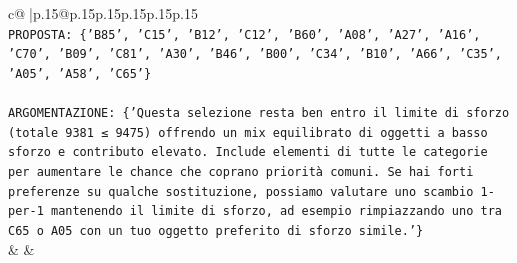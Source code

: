 \documentclass{article}
\begin{document}
{\begin{supertabular}{c@{$\;$}|p{.15\linewidth}@{}p{.15\linewidth}p{.15\linewidth}p{.15\linewidth}p{.15\linewidth}p{.15\linewidth}}
{{{\\ 
\texttt{PROPOSTA: \{'B85', 'C15', 'B12', 'C12', 'B60', 'A08', 'A27', 'A16', 'C70', 'B09', 'C81', 'A30', 'B46', 'B00', 'C34', 'B10', 'A66', 'C35', 'A05', 'A58', 'C65'\}} \\
\\ 
\texttt{ARGOMENTAZIONE: \{'Questa selezione resta ben entro il limite di sforzo (totale 9381 ≤ 9475) offrendo un mix equilibrato di oggetti a basso sforzo e contributo elevato. Include elementi di tutte le categorie per aumentare le chance che coprano priorità comuni. Se hai forti preferenze su qualche sostituzione, possiamo valutare uno scambio 1{-}per{-}1 mantenendo il limite di sforzo, ad esempio rimpiazzando uno tra C65 o A05 con un tuo oggetto preferito di sforzo simile.'\}} \\
            }
        }
    }
    & & \\ \\


\end{supertabular}}
\end{document}
